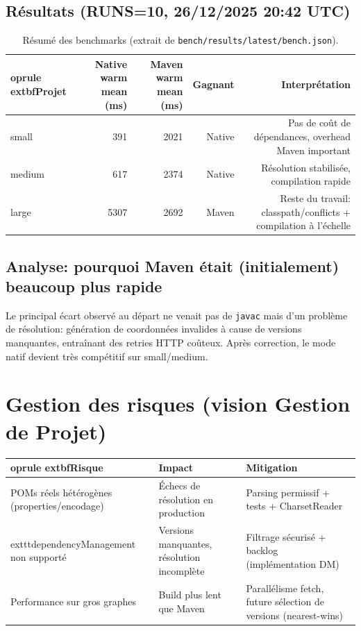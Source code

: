 \documentclass[11pt,a4paper]{article}
\begin{document}
\subsection{Résultats (RUNS=10, 26/12/2025 20:42 UTC)}
\begin{table}[h]
\centering
\begin{tabular}{lrrrr}
	oprule
	extbf{Projet} & \textbf{Native warm mean (ms)} & \textbf{Maven warm mean (ms)} & \textbf{Gagnant} & \textbf{Interprétation}\\
\midrule
small  & 391  & 2021 & Native & Pas de coût de dépendances, overhead Maven important \\
medium & 617  & 2374 & Native & Résolution stabilisée, compilation rapide \\
large  & 5307 & 2692 & Maven  & Reste du travail: classpath/conflicts + compilation à l’échelle \\
\bottomrule
\end{tabular}
\caption{Résumé des benchmarks (extrait de \texttt{bench/results/latest/bench.json}).}
\end{table}

\subsection{Analyse: pourquoi Maven était (initialement) beaucoup plus rapide}
Le principal écart observé au départ ne venait pas de \texttt{javac} mais d’un problème de résolution: génération de coordonnées invalides à cause de versions manquantes, entraînant des retries HTTP coûteux. Après correction, le mode natif devient très compétitif sur small/medium.

\section{Gestion des risques (vision Gestion de Projet)}
\begin{longtable}{p{4cm}p{6.5cm}p{4cm}}
	oprule
	extbf{Risque} & \textbf{Impact} & \textbf{Mitigation}\\
\midrule
POMs réels hétérogènes (properties/encodage) & Échecs de résolution en production & Parsing permissif + tests + CharsetReader \\
	exttt{dependencyManagement} non supporté & Versions manquantes, résolution incomplète & Filtrage sécurisé + backlog (implémentation DM) \\
Performance sur gros graphes & Build plus lent que Maven & Parallélisme fetch, future sélection de versions (nearest-wins) \\
\bottomrule
\end{longtable}
\end{document}
